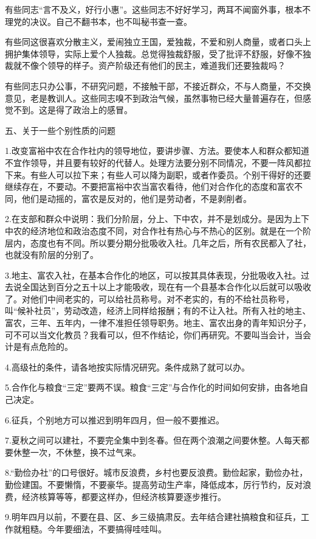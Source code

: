 有些同志“言不及义，好行小惠”。这些同志不好好学习，两耳不闻窗外事，根本不理党的决议。自己不翻书本，也不叫秘书查一查。

有些同这很喜欢分散主义，爱闹独立王国，爱独裁，不爱和别人商量，或者口头上拥护集体领导，实际上爱个人独裁。总觉得独裁舒服，受了批评不舒服，好像不独裁就不像个领导的样子。资产阶级还有他们的民主，难道我们还要独裁吗？

有些同志只办公事，不研究问题，不接触干部，不接近群众，不与人商量，不交换意见，老是教训人。这些同志嗅不到政治气候，虽然事物已经大量普遍存在，但感觉不到。这是得了政治上的感冒。

五、关于一些个别性质的问题

1.改变富裕中农在合作社内的领导地位，要讲步骤、方法。要使本人和群众都知道不宜作领导，并且要有较好的代替人。处理方法要分别不同情况，不要一阵风都拉下来。有些人可以拉下来；有些人可以降为副职，或者作委员。个别干得好的还要继续存在，不要动。不要把富裕中农当富农看待，他们对合作化的态度和富农不同，他们是动摇的，富农是反对的，他们是劳动者，不是剥削者。

2.在支部和群众中说明：我们分阶层，分上、下中农，并不是划成分。是因为上下中农的经济地位和政治态度不同，对合作社有热心与不热心的区别。就是在一个阶层内，态度也有不同。所以要分期分批吸收入社。几年之后，所有农民都入了社，也就没有阶层的分别了。

3.地主、富农入社，在基本合作化的地区，可以按其具体表现，分批吸收入社。过去说全国达到百分之五十以上才能吸收，现在有一个县基本合作化以后就可以吸收了。对他们中间老实的，可以给社员称号。对不老实的，有的不给社员称号，叫“候补社员”，劳动改造，经济上同样给报酬；有的不让入社。所有入社的地主、富农，三年、五年内，一律不准担任领导职务。地主、富农出身的青年知识分子，可不可以当文化教员？我看可以，但不作结论，你们再研究。不要叫当会计，当会计是有点危险的。

4.高级社的条件，请各地按实际情况研究。条件成熟了就可以办。

5.合作化与粮食“三定”要两不误。粮食“三定”与合作化的时间如何安排，由各地自己决定。

6.征兵，个别地方可以推迟到明年四月，但一般不要推迟。

7.夏秋之间可以建社，不要完全集中到冬春。但在两个浪潮之间要休整。人每天都要休整一次，不休整，换不过气来。

8.“勤俭办社”的口号很好。城市反浪费，乡村也要反浪费。勤俭起家，勤俭办社，勤俭建国。不要懒惰，不要豪华。提高劳动生产率，降低成本，厉行节约，反对浪费，经济核算等等，都要这样办，但经济核算要逐步推行。

9.明年四月以前，不要在县、区、乡三级搞肃反。去年结合建社搞粮食和征兵，工作就粗糙。今年要细法，不要搞得哇哇叫。

